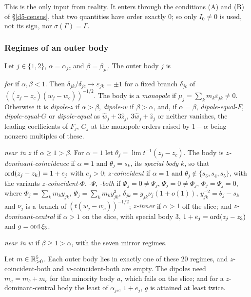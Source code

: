 This is the only input from reality.  It enters through the conditions (A) and (B) of
\S\ref{d5-census}, that two quantities have order exactly $0$; so only $I_0\ne0$ is used, not its
sign, nor $\sigma(\Gamma)=\Gamma$.

\subsubsection{Regimes of an outer body}\label{d5-regimes}
\begin{definition}\label{d5-def-regimes}
Let $j\in\{1,2\}$, $\alpha=\alpha_{jc}$ and $\beta=\beta_{jc}$.  The outer body $j$ is
\begin{alphalist}
\item \emph{far} if $\alpha,\beta<1$.  Then $\delta_{jk}/\delta_{jc}\to\varepsilon_{jk}=\pm1$ for a
fixed branch $\delta_{jc}$ of $((z_j-z_c)(w_j-w_c))^{-1/2}$.  The body is a \emph{monopole} if
$\mu_j=\sum_km_k\varepsilon_{jk}\ne0$.  Otherwise it is \emph{dipole-$z$} if $\alpha>\beta$,
\emph{dipole-$w$} if $\beta>\alpha$, and, if $\alpha=\beta$, \emph{dipole-equal-$F$},
\emph{dipole-equal-$G$} or \emph{dipole-equal} as $\hat w_j+3\hat z_j$, $3\hat w_j+\hat z_j$ or
neither vanishes, the leading coefficients of $F_j$, $G_j$ at the monopole orders raised by
$1-\alpha$ being nonzero multiples of these.
\item \emph{near in $z$} if $\alpha\ge1>\beta$.  For $\alpha=1$ let
$\theta_j=\lim t^{-1}(z_j-z_c)$.  The body is \emph{$z$-dominant-coincidence} if $\alpha=1$ and
$\theta_j=s_k$, its \emph{special body} $k$, so that $\operatorname{ord}(z_j-z_k)=1+e_j$ with $e_j>0$;
\emph{$z$-coincident} if $\alpha=1$ and $\theta_j\notin\{s_3,s_4,s_5\}$, with the variants
\emph{$z$-coincident-$\Phi$}, \emph{-$\Psi$}, \emph{-both} if $\Phi_j=0\ne\Psi_j$,
$\Psi_j=0\ne\Phi_j$, $\Phi_j=\Psi_j=0$, where $\Phi_j=\sum_km_ky_{jk}$, $\Psi_j=\sum_km_ky_{jk}^3$,
$\delta_{jk}=y_{jk}\nu_j(1+o(1))$, $y_{jk}^{-2}=\theta_j-s_k$ and $\nu_j$ is a branch of
$(t(w_j-w_c))^{-1/2}$; \emph{$z$-inner} if $\alpha>1$ off the slice; and
\emph{$z$-dominant-central} if $\alpha>1$ on the slice, with special body $3$,
$1+e_j=\operatorname{ord}(z_j-z_3)$ and $g=\operatorname{ord}\xi_3$.
\item \emph{near in $w$} if $\beta\ge1>\alpha$, with the seven mirror regimes.
\end{alphalist}
\end{definition}

\begin{lemma}\label{d5-lem-complete}
Let $m\in\mathbb{R}_{>0}^5$.  Each outer body lies in exactly one of these $20$ regimes, and
$z$-coincident-both and $w$-coincident-both are empty.  The dipoles need $m_a=m_b+m_c$ for the
minority body $a$, which fails on the slice; and for a $z$-dominant-central body the least of
$\alpha_{jc}$, $1+e_j$, $g$ is attained at least twice.
\end{lemma}

